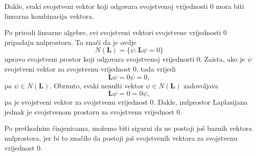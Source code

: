 Dakle, svaki svojstveni vektor koji odgovara svojstvenoj vrijednosti \(0\) mora biti linearna kombinacija vektora.

Po prirodi linearne algebre, svi svojstveni vektori svojstvene vrijednosti \(0\) pripadaju
 nulprostoru. To znači da je ovdje
   \begin{equation}
       N(\mathbf{L})
       =
       \{\psi : \mathbf{L}\psi=0\}
   \end{equation}
   upravo svojstveni prostor koji odgovara svojstvenoj vrijednosti \(0\). Zaista, ako je \(\psi\)
 svojstveni vektor za svojstvenu vrijednost \(0\), tada vrijedi
   \begin{equation}
       \mathbf{L}\psi=0\psi=0,
   \end{equation}
   pa \(\psi\in N(\mathbf{L})\). Obrnuto, svaki nenulti vektor \(\psi\in N(\mathbf{L})\) zadovoljava
   \begin{equation}
       \mathbf{L}\psi=0=0\psi,
   \end{equation}
   pa je svojstveni vektor za svojstvenu vrijednost \(0\). Dakle, nulprostor Laplasijana jednak je
 svojstvenom prostoru za svojstvenu vrijednost \(0\).

 Po prethodnim činjenicama, možemo biti sigurni da ne postoji još baznih vektora nulprostora, jer bi to značilo da postoji još svojstvenih vektora za svojstvenu vrijednost 0.


